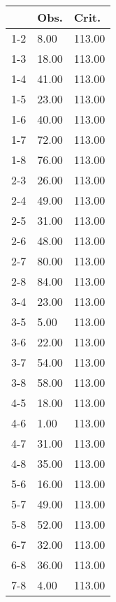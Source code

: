 \begin{table}[ht]
\centering
\begin{tabular}{rll}
  \hline
 & Obs. & Crit. \\ 
  \hline
1-2 & 8.00 & 113.00 \\ 
  1-3 & 18.00 & 113.00 \\ 
  1-4 & 41.00 & 113.00 \\ 
  1-5 & 23.00 & 113.00 \\ 
  1-6 & 40.00 & 113.00 \\ 
  1-7 & 72.00 & 113.00 \\ 
  1-8 & 76.00 & 113.00 \\ 
  2-3 & 26.00 & 113.00 \\ 
  2-4 & 49.00 & 113.00 \\ 
  2-5 & 31.00 & 113.00 \\ 
  2-6 & 48.00 & 113.00 \\ 
  2-7 & 80.00 & 113.00 \\ 
  2-8 & 84.00 & 113.00 \\ 
  3-4 & 23.00 & 113.00 \\ 
  3-5 & 5.00 & 113.00 \\ 
  3-6 & 22.00 & 113.00 \\ 
  3-7 & 54.00 & 113.00 \\ 
  3-8 & 58.00 & 113.00 \\ 
  4-5 & 18.00 & 113.00 \\ 
  4-6 & 1.00 & 113.00 \\ 
  4-7 & 31.00 & 113.00 \\ 
  4-8 & 35.00 & 113.00 \\ 
  5-6 & 16.00 & 113.00 \\ 
  5-7 & 49.00 & 113.00 \\ 
  5-8 & 52.00 & 113.00 \\ 
  6-7 & 32.00 & 113.00 \\ 
  6-8 & 36.00 & 113.00 \\ 
  7-8 & 4.00 & 113.00 \\ 
   \hline
\end{tabular}
\end{table}
